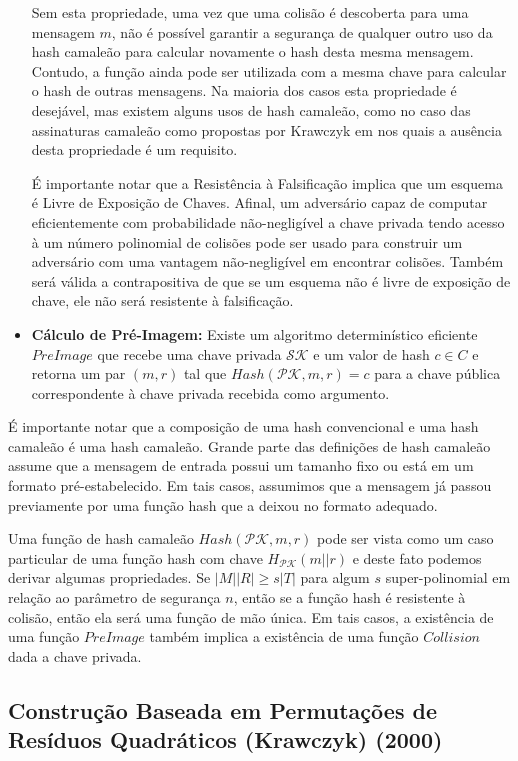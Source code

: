 \documentclass[a4paper]{article}
\begin{document}
\begin{itemize}
  Sem esta propriedade, uma vez que uma colisão é descoberta para uma
  mensagem $m$, não é possível garantir a segurança de qualquer outro
  uso da hash camaleão para calcular novamente o hash desta mesma
  mensagem. Contudo, a função ainda pode ser utilizada com a mesma
  chave para calcular o hash de outras mensagens. Na maioria dos casos
  esta propriedade é desejável, mas existem alguns usos de hash
  camaleão, como no caso das assinaturas camaleão como propostas por
  Krawczyk em \cite{krawczyk} nos quais a ausência desta propriedade é
  um requisito.

  É importante notar que a Resistência à Falsificação implica que um
  esquema é Livre de Exposição de Chaves. Afinal, um adversário capaz
  de computar eficientemente com probabilidade não-negligível a chave
  privada tendo acesso à um número polinomial de colisões pode ser
  usado para construir um adversário com uma vantagem não-negligível
  em encontrar colisões. Também será válida a contrapositiva de que se
  um esquema não é livre de exposição de chave, ele não será
  resistente à falsificação.
  
\item\textbf{Cálculo de Pré-Imagem:} Existe um algoritmo
  determinístico eficiente $PreImage$ que recebe uma chave privada
  $\mathcal{SK}$ e um valor de hash $c \in C$ e retorna um par $(m,
  r)$ tal que $Hash(\mathcal{PK}, m, r) = c$ para a chave pública
  correspondente à chave privada recebida como argumento.
\end{itemize}
  
É importante notar que a composição de uma hash convencional e uma
hash camaleão é uma hash camaleão. Grande parte das definições de hash
camaleão assume que a mensagem de entrada possui um tamanho fixo ou
está em um formato pré-estabelecido. Em tais casos, assumimos que a
mensagem já passou previamente por uma função hash que a deixou no
formato adequado.

Uma função de hash camaleão $Hash(\mathcal{PK}, m, r)$ pode ser vista
como um caso particular de uma função hash com chave
$H_{\mathcal{PK}}(m||r)$ e deste fato podemos derivar algumas
propriedades. Se $|M||R| \geq s |T|$ para algum $s$ super-polinomial
em relação ao parâmetro de segurança $n$, então se a função hash é
resistente à colisão, então ela será uma função de mão única. Em tais
casos, a existência de uma função $PreImage$ também implica a
existência de uma função $Collision$ dada a chave privada.

\subsection{Construção Baseada em Permutações de Resíduos Qua\-drá\-ti\-cos
  (Krawczyk) (2000) \cite{krawczyk}}
\end{document}
